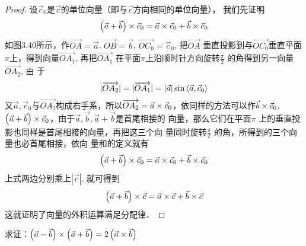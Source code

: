 \begin{figure}[htp]
    \centering
{}    
    \caption{}
\end{figure}

\begin{proof}
    设$\vec{c}_0$是$\vec{c}$的单位向量（即与$\vec{c}$方向相同的单位向量），
我们先证明
\[\left(\vec{a}+\vec{b}\right)\times \vec{c}_0=\vec{a}\times \vec{c}_0+\vec{b}\times \vec{c}_0
\]
如图3.40所示，作$\Vec{OA}=\vec{a}$, $\Vec{OB}=\vec{b}$, $\Vec{OC_0}=\vec{c}_0$, 把$\Vec{OA}$
垂直投影到与$\Vec{OC_0}$垂直平面$\pi$上，得到向量$\Vec{OA_1}$, 再把$\Vec{OA_1}$
在平面$\pi$上沿顺时针方向旋转$\frac{\pi}{2}$
的角得到另一向量$\Vec{OA_2}$, 由
于
\[|\overrightarrow{OA_2}|=|\overrightarrow{OA_1}|=|\vec{a}|\sin\left\langle \vec{a},\vec{c}_0 \right\rangle\]
又$\vec{a},\vec{c}_0$与$\Vec{OA_2}$构成右手系，所以$\overrightarrow{OA_2}=\vec{a}\times \vec{c}_0$，依同样的方法可以作$\vec{b}\times \vec{c}_0$, $\left(\vec{a}+\vec{b}\right)\times \vec{c}_0$，由于$\vec{a},\vec{b},\vec{a}+\vec{b}$是首尾相接的
向量，那么它们在平面$\pi$
上的垂直投影也同样是首尾相接的向量，再把这三个向
量同时旋转$\frac{\pi}{2}$
的角，所得到的三个向量也必首尾相接，依向
量和的定义就有
\[\left(\vec{a}+\vec{b}\right)\times \vec{c}_0=\vec{a}\times \vec{c}_0+\vec{b}\times \vec{c}_0
\]
上式两边分别乘上$|\vec{c}|$, 就可得到
\[\left(\vec{a}+\vec{b}\right)\times \vec{c}=\vec{a}\times \vec{c}+\vec{b}\times \vec{c}
\]
这就证明了向量的外积运算满足分配律．
\end{proof}


\begin{example}
      求证：$\left(\vec{a}-\vec{b}\right)\times\left(\vec{a}+\vec{b}\right)=2\left(\vec{a}\times \vec{b}\right)$
\end{example}

